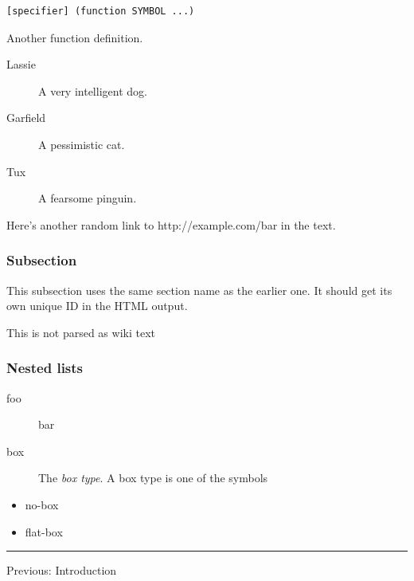 \documentclass[12pt]{article}
\begin{document}
\begin{verbatim}
[specifier] (function SYMBOL ...)
\end{verbatim}

Another function definition.

\begin{description}
\item[{Lassie}] A very intelligent dog.
\item[{Garfield}] A pessimistic cat.
\item[{Tux}] A fearsome pinguin.
\end{description}

Here's another random link to http://example.com/bar in the text.

\subsubsection{Subsection}\label{subsection-2}

This subsection uses the same section name as the earlier one. It should
get its own unique ID in the HTML output.

\begin{center}
This is not parsed as wiki text
\end{center}

\subsubsection{Nested lists}\label{nested-lists}

\begin{description}
\item[{foo}] bar
\item[{box}] The \emph{box type}. A box type is one of the symbols
\end{description}

\begin{itemize}
\item no-box
\item flat-box
\end{itemize}

\begin{center}\rule{0.8\textwidth}{0.4pt}\end{center}

Previous: Introduction
\end{document}
